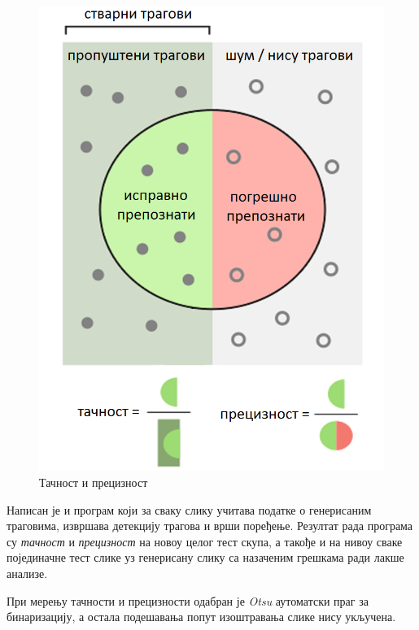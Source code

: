 \documentclass[12pt,a4paper,serbian,oneside]{book}
\begin{document}
\begin{figure}[H]
\begin{center}
\includegraphics[width=120mm]{images/recall_prec.png}
\end{center}
\caption{Тачност и прецизност}
\label{fig:recall_prec}
\end{figure}

Написан је и програм који за сваку слику учитава податке о генерисаним траговима, извршава детекцију трагова и врши поређење. Резултат рада програма су \textit{тачност} и \textit{прецизност} на новоу целог тест скупа, а такође и на нивоу сваке појединачне тест слике уз генерисану слику са назаченим грешкама ради лакше анализе.

При мерењу тачности и прецизности одабран је \textit{Otsu} аутоматски праг за бинаризацију, а остала подешавања попут изоштравања слике нису укључена.
\end{document}
